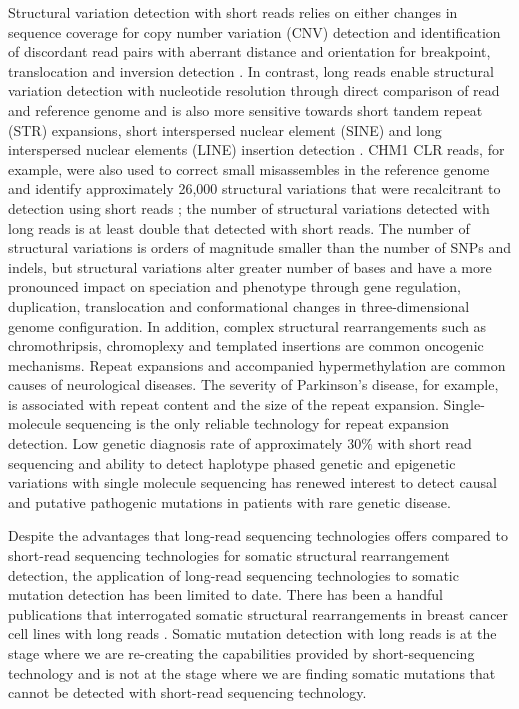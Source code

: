 Structural variation detection with short reads relies on either changes in sequence coverage for copy number variation (CNV) detection and identification of discordant read pairs with aberrant distance and orientation for breakpoint, translocation and inversion detection \cite{Alkan2011-dv}. In contrast, long reads enable structural variation detection with nucleotide resolution through direct comparison of read and reference genome and is also more sensitive towards short tandem repeat (STR) expansions, short interspersed nuclear element (SINE) and long interspersed nuclear elements (LINE) insertion detection \cite{Chaisson2015-zz, Sedlazeck2018-oh, Denti2022-ux}. CHM1 CLR reads, for example, were also used to correct small misassembles in the reference genome and identify approximately 26,000 structural variations that were recalcitrant to detection using short reads \cite{Chaisson2015-zz}; the number of structural variations detected with long reads is at least double that detected with short reads. The number of structural variations is orders of magnitude smaller than the number of SNPs and indels, but structural variations alter greater number of bases and have a more pronounced impact on speciation and phenotype through gene regulation, duplication, translocation\cite{Weischenfeldt2013-tl} and conformational changes in three-dimensional genome configuration\cite{Spielmann2018-fm,}. In addition, complex structural rearrangements such as chromothripsis\cite{Stephens2011-gj, Korbel2013-to}, chromoplexy\cite{Baca2013-po} and templated insertions\cite{Yu2010-jr} are common oncogenic mechanisms. Repeat expansions and accompanied hypermethylation are common causes of neurological diseases\cite{Zhou2022-ci}. The severity of Parkinson’s disease, for example, is associated with repeat content and the size of the repeat expansion\cite{}. Single-molecule sequencing is the only reliable technology for repeat expansion detection. Low genetic diagnosis rate of approximately 30\% with short read sequencing and ability to detect haplotype phased genetic and epigenetic variations with single molecule sequencing has renewed interest to detect causal and putative pathogenic mutations in patients with rare genetic disease\cite{}. 

Despite the advantages that long-read sequencing technologies offers compared to short-read sequencing technologies for somatic structural rearrangement detection, the application of long-read sequencing technologies to somatic mutation detection has been limited to date. There has been a handful publications that interrogated somatic structural rearrangements in breast cancer cell lines with long reads \cite{}. Somatic mutation detection with long reads is at the stage where we are re-creating the capabilities provided by short-sequencing technology and is not at the stage where we are finding somatic mutations that cannot be detected with short-read sequencing technology.


